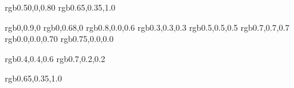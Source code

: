 

\usepackage{color}
\usepackage{xcolor}
\definecolor{darkpurple}  {rgb}{0.50,0,0.80}      %
\definecolor{purple}         {rgb}{0.65,0.35,1.0}    %

\definecolor{lime}       {rgb}{0,0.9,0}        %
\definecolor{green}    {rgb}{0,0.68,0}       %
\definecolor{magenta}  {rgb}{0.8,0.0,0.6}    %
\definecolor{dgrey}     {rgb}{0.3,0.3,0.3}    %
\definecolor{grey}       {rgb}{0.5,0.5,0.5}    %
\definecolor{lgrey}      {rgb}{0.7,0.7,0.7}    %
\definecolor{darkblue} {rgb}{0.0,0.0,0.70}   %
\definecolor{darkred}  {rgb}{0.75,0.0,0.0}   %





\definecolor{oldcolor}     {rgb}{0.4,0.4,0.6}  %
\definecolor{usedcolor}  {rgb}{0.7,0.2,0.2}  %

\definecolor{jb}  {rgb}{0.65,0.35,1.0}  %